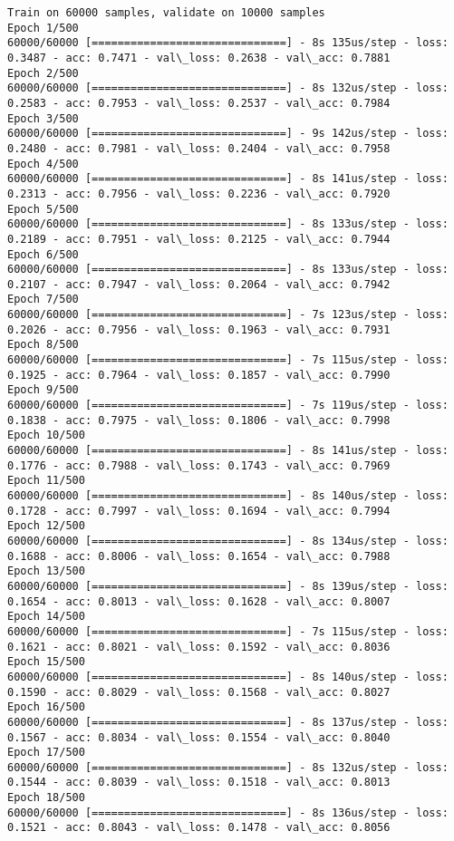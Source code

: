 \documentclass[11pt]{article}
\begin{document}
    \begin{Verbatim}[commandchars=\\\{\}]
Train on 60000 samples, validate on 10000 samples
Epoch 1/500
60000/60000 [==============================] - 8s 135us/step - loss: 0.3487 - acc: 0.7471 - val\_loss: 0.2638 - val\_acc: 0.7881
Epoch 2/500
60000/60000 [==============================] - 8s 132us/step - loss: 0.2583 - acc: 0.7953 - val\_loss: 0.2537 - val\_acc: 0.7984
Epoch 3/500
60000/60000 [==============================] - 9s 142us/step - loss: 0.2480 - acc: 0.7981 - val\_loss: 0.2404 - val\_acc: 0.7958
Epoch 4/500
60000/60000 [==============================] - 8s 141us/step - loss: 0.2313 - acc: 0.7956 - val\_loss: 0.2236 - val\_acc: 0.7920
Epoch 5/500
60000/60000 [==============================] - 8s 133us/step - loss: 0.2189 - acc: 0.7951 - val\_loss: 0.2125 - val\_acc: 0.7944
Epoch 6/500
60000/60000 [==============================] - 8s 133us/step - loss: 0.2107 - acc: 0.7947 - val\_loss: 0.2064 - val\_acc: 0.7942
Epoch 7/500
60000/60000 [==============================] - 7s 123us/step - loss: 0.2026 - acc: 0.7956 - val\_loss: 0.1963 - val\_acc: 0.7931
Epoch 8/500
60000/60000 [==============================] - 7s 115us/step - loss: 0.1925 - acc: 0.7964 - val\_loss: 0.1857 - val\_acc: 0.7990
Epoch 9/500
60000/60000 [==============================] - 7s 119us/step - loss: 0.1838 - acc: 0.7975 - val\_loss: 0.1806 - val\_acc: 0.7998
Epoch 10/500
60000/60000 [==============================] - 8s 141us/step - loss: 0.1776 - acc: 0.7988 - val\_loss: 0.1743 - val\_acc: 0.7969
Epoch 11/500
60000/60000 [==============================] - 8s 140us/step - loss: 0.1728 - acc: 0.7997 - val\_loss: 0.1694 - val\_acc: 0.7994
Epoch 12/500
60000/60000 [==============================] - 8s 134us/step - loss: 0.1688 - acc: 0.8006 - val\_loss: 0.1654 - val\_acc: 0.7988
Epoch 13/500
60000/60000 [==============================] - 8s 139us/step - loss: 0.1654 - acc: 0.8013 - val\_loss: 0.1628 - val\_acc: 0.8007
Epoch 14/500
60000/60000 [==============================] - 7s 115us/step - loss: 0.1621 - acc: 0.8021 - val\_loss: 0.1592 - val\_acc: 0.8036
Epoch 15/500
60000/60000 [==============================] - 8s 140us/step - loss: 0.1590 - acc: 0.8029 - val\_loss: 0.1568 - val\_acc: 0.8027
Epoch 16/500
60000/60000 [==============================] - 8s 137us/step - loss: 0.1567 - acc: 0.8034 - val\_loss: 0.1554 - val\_acc: 0.8040
Epoch 17/500
60000/60000 [==============================] - 8s 132us/step - loss: 0.1544 - acc: 0.8039 - val\_loss: 0.1518 - val\_acc: 0.8013
Epoch 18/500
60000/60000 [==============================] - 8s 136us/step - loss: 0.1521 - acc: 0.8043 - val\_loss: 0.1478 - val\_acc: 0.8056

\end{Verbatim}
\end{document}
